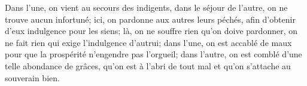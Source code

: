 Dans l’une, on vient au secours des indigents,
	dans le séjour de l’autre, on ne trouve aucun infortuné;
	ici, on pardonne aux autres leurs péchés,
		afin d’obtenir d’eux indulgence pour les siens;
	là, on ne souffre rien qu’on doive pardonner,
		on ne fait rien qui exige l’indulgence d’autrui;
	dans l’une, on est accablé de maux
		pour que la prospérité n’engendre pas l’orgueil;
	dans l’autre, on est comblé d’une telle abondance de grâces,
		qu’on est à l’abri de tout mal et qu’on s’attache au souverain bien.
